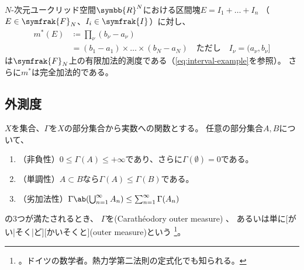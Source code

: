 \documentclass[../sotsu.tex]{subfiles}
\begin{document}
\begin{proposition}
    \label{thm:Lebesgue-finitely-additive-measure}
    $N$-次元ユークリッド空間$\symbb{R}^N$における区間塊$E = I_1 + \dots + I_n$
    （$E \in \symfrak{F}_N$、$I_i \in \symfrak{I}$）に対し、
    \begin{equation}
        \begin{split}
            m^* (E)  &\coloneq  \prod_\nu (b_\nu - a_\nu)  \\
                     &=  (b_1 - a_1) \times \dots \times (b_N - a_N)
                     \quad \text{ただし} \quad I_\nu = (a_\nu, b_\nu]
        \end{split}
    \end{equation}
    は$\symfrak{F}_N$上の有限加法的測度である（\cref{eq:interval-example}を参照）。
    さらに$m^*$は完全加法的である。
\end{proposition}



\subsection{外測度}

\begin{definition}[外測度]
    $X$を集合、$\Gamma$を$X$の部分集合から実数への関数とする。
    任意の部分集合$A, B$について、
    \begin{enumerate}
        \item （非負性）$0 \leq \Gamma(A) \leq +\infty$であり、さらに$\Gamma(\emptyset) = 0$である。
        \item （単調性）$A \subset B$なら$\Gamma(A) \leq \Gamma(B)$である。
        \item （劣加法性）$\Gamma \ab( \bigcup_{n=1}^{\infty} A_n ) \leq \sum_{n=1}^{\infty} \Gamma(A_n)$
    \end{enumerate}
    の3つが満たされるとき、
    $\Gamma$を(Carathéodory outer measure)%
    \cite{rikagaku-eiwa}、
    あるいは単に[がい|そく|ど][かいそくと](outer measure)という\cite{ito-lebesgue-1963}%
    \footnote{。ドイツの数学者。熱力学第二法則の定式化でも知られる。\cite{nipponica}}。
\end{definition}
\end{document}
